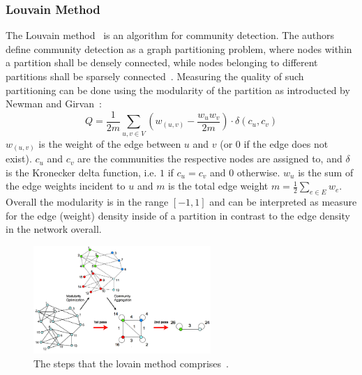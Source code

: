             \subsubsection*{Louvain Method}\label{louvain-desc}
                The Louvain method~\autocite{blondel2008fast} is an algorithm for community detection. 
                The authors define community detection as a graph partitioning problem, where nodes within a partition shall be densely connected, while nodes belonging to different partitions shall be sparsely connected~\autocite{blondel2008fast}.
                Measuring the quality of such partitioning can be done using the modularity of the partition as introducted by Newman and Girvan~\autocite{girvan2002community}:
                \[ Q = \frac{1}{2m} \sum_{u,v \in V} \left( w_{(u, v)} - \frac{w_u w_v}{2m} \right) \cdot \delta (c_u, c_v) \]
                $w_{(u,v)}$ is the weight of the edge between $u$ and $v$ (or $0$ if the edge does not exist). 
                $c_u$ and $c_v$ are the communities the respective nodes are assigned to, and $\delta$ is the Kronecker delta function, i.e. $1$ if $c_u = c_v$ and $0$ otherwise. 
                $w_u$ is the sum of the edge weights incident to $u$ and $m$ is the total edge weight $m = \frac{1}{2} \sum_{e \in E} w_e$.
                Overall the modularity is in the range $[-1, 1]$ and can be interpreted as measure for the edge (weight) density inside of a partition in contrast to the edge density in the network overall.
                
                \begin{figure}[htp]
                    \begin{center}
                        \includegraphics[keepaspectratio,width=0.6\textwidth]{img/03-graphs/louvain.png}
                    \end{center}
                    \caption{The steps that the lovain method comprises~\autocite{blondel2008fast}.} 
                    \label{louvain-fig}
                \end{figure}
                
